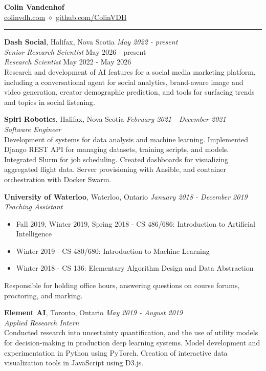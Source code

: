 \documentclass[letterpaper,10pt]{article}
\newenvironment{rsection}[1]{%
  \Needspace{5\baselineskip}\vspace{6pt}{\bfseries\MakeUppercase{#1}}\par\vspace{2pt}\hrule\vspace{4pt}
  \begin{list}{}{\setlength{\leftmargin}{1.5em}\setlength{\itemsep}{5pt}\setlength{\parsep}{0pt}\setlength{\topsep}{0pt}}
}{\end{list}}
\begin{document}
\begin{center}
  {\huge\bfseries Colin Vandenhof}\\[4pt]
  \href{https://www.colinvdh.com}{colinvdh.com} $\diamond$ \href{https://www.github.com/ColinVDH}{github.com/ColinVDH}
\end{center}

\begin{rsection}{Work Experience}
\item[] {\bfseries Dash Social}, Halifax, Nova Scotia \hfill {\itshape May 2022 - present}\\
  {\itshape Senior Research Scientist} \hfill May 2026 - present\\
  {\itshape Research Scientist} \hfill May 2022 - May 2026\\
  Research and development of AI features for a social media marketing platform, including a conversational agent for social analytics, brand-aware image and video generation, creator demographic prediction, and tools for surfacing trends and topics in social listening.

\item[] {\bfseries Spiri Robotics}, Halifax, Nova Scotia \hfill {\itshape February 2021 - December 2021}\\
  {\itshape Software Engineer}\\
  Development of systems for data analysis and machine learning. Implemented Django REST API for managing datasets, training scripts, and models. Integrated Slurm for job scheduling. Created dashboards for visualizing aggregated flight data. Server provisioning with Ansible, and container orchestration with Docker Swarm.

\item[] {\bfseries University of Waterloo}, Waterloo, Ontario \hfill {\itshape January 2018 - December 2019}\\
  {\itshape Teaching Assistant}
  \begin{itemize}
    \item Fall 2019, Winter 2019, Spring 2018 - CS 486/686: Introduction to Artificial Intelligence
    \item Winter 2019 - CS 480/680: Introduction to Machine Learning
    \item Winter 2018 - CS 136: Elementary Algorithm Design and Data Abstraction
  \end{itemize}
  Responsible for holding office hours, answering questions on course forums, proctoring, and marking.

\item[] {\bfseries Element AI}, Toronto, Ontario \hfill {\itshape May 2019 - August 2019}\\
  {\itshape Applied Research Intern}\\
  Conducted research into uncertainty quantification, and the use of utility models for decision-making in production deep learning systems. Model development and experimentation in Python using PyTorch. Creation of interactive data visualization tools in JavaScript using D3.js.


\end{rsection}
\end{document}
